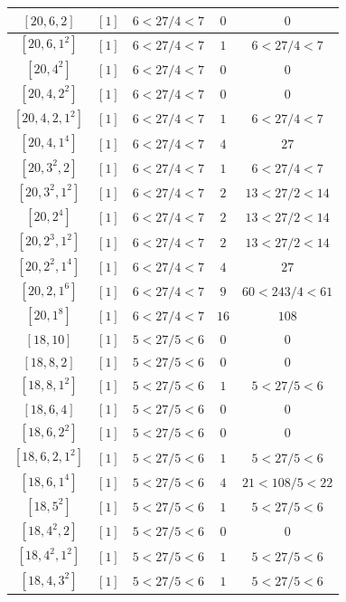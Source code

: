 \documentclass{article}%
\begin{document}
\begin{center}
\begin{longtable}{||c|c|c|c|c||}
$[20, 6, 2]$ & $[1]$ & $6 < 27/4 < 7$ & $0$ & $0$ \\ \hline 
$[20, 6, 1^{2}]$ & $[1]$ & $6 < 27/4 < 7$ & $1$ & $6 < 27/4 < 7$ \\ \hline 
$[20, 4^{2}]$ & $[1]$ & $6 < 27/4 < 7$ & $0$ & $0$ \\ \hline 
$[20, 4, 2^{2}]$ & $[1]$ & $6 < 27/4 < 7$ & $0$ & $0$ \\ \hline 
$[20, 4, 2, 1^{2}]$ & $[1]$ & $6 < 27/4 < 7$ & $1$ & $6 < 27/4 < 7$ \\ \hline 
$[20, 4, 1^{4}]$ & $[1]$ & $6 < 27/4 < 7$ & $4$ & $27$ \\ \hline 
$[20, 3^{2}, 2]$ & $[1]$ & $6 < 27/4 < 7$ & $1$ & $6 < 27/4 < 7$ \\ \hline 
$[20, 3^{2}, 1^{2}]$ & $[1]$ & $6 < 27/4 < 7$ & $2$ & $13 < 27/2 < 14$ \\ \hline 
$[20, 2^{4}]$ & $[1]$ & $6 < 27/4 < 7$ & $2$ & $13 < 27/2 < 14$ \\ \hline 
$[20, 2^{3}, 1^{2}]$ & $[1]$ & $6 < 27/4 < 7$ & $2$ & $13 < 27/2 < 14$ \\ \hline 
$[20, 2^{2}, 1^{4}]$ & $[1]$ & $6 < 27/4 < 7$ & $4$ & $27$ \\ \hline 
$[20, 2, 1^{6}]$ & $[1]$ & $6 < 27/4 < 7$ & $9$ & $60 < 243/4 < 61$ \\ \hline 
$[20, 1^{8}]$ & $[1]$ & $6 < 27/4 < 7$ & $16$ & $108$ \\ \hline 
$[18, 10]$ & $[1]$ & $5 < 27/5 < 6$ & $0$ & $0$ \\ \hline 
$[18, 8, 2]$ & $[1]$ & $5 < 27/5 < 6$ & $0$ & $0$ \\ \hline 
$[18, 8, 1^{2}]$ & $[1]$ & $5 < 27/5 < 6$ & $1$ & $5 < 27/5 < 6$ \\ \hline 
$[18, 6, 4]$ & $[1]$ & $5 < 27/5 < 6$ & $0$ & $0$ \\ \hline 
$[18, 6, 2^{2}]$ & $[1]$ & $5 < 27/5 < 6$ & $0$ & $0$ \\ \hline 
$[18, 6, 2, 1^{2}]$ & $[1]$ & $5 < 27/5 < 6$ & $1$ & $5 < 27/5 < 6$ \\ \hline 
$[18, 6, 1^{4}]$ & $[1]$ & $5 < 27/5 < 6$ & $4$ & $21 < 108/5 < 22$ \\ \hline 
$[18, 5^{2}]$ & $[1]$ & $5 < 27/5 < 6$ & $1$ & $5 < 27/5 < 6$ \\ \hline 
$[18, 4^{2}, 2]$ & $[1]$ & $5 < 27/5 < 6$ & $0$ & $0$ \\ \hline 
$[18, 4^{2}, 1^{2}]$ & $[1]$ & $5 < 27/5 < 6$ & $1$ & $5 < 27/5 < 6$ \\ \hline 
$[18, 4, 3^{2}]$ & $[1]$ & $5 < 27/5 < 6$ & $1$ & $5 < 27/5 < 6$ \\ \hline 

\end{longtable}
\end{center}
\end{document}
